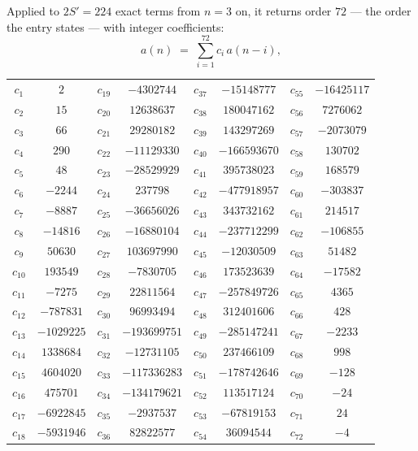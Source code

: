 \documentclass[11pt,a4paper]{article}
\theoremstyle{plain}
\theoremstyle{definition}
\begin{document}
Applied to $2S'=224$ exact terms from $n=3$ on, it returns order $72$ --- the
order the entry states --- with integer coefficients:
\[
a(n)\;=\;\sum_{i=1}^{72}c_i\,a(n-i),
\]
\begin{center}\small
\begin{tabular}{cccccccc}
$c_{1}$ & $2$ & $c_{19}$ & $-4302744$ & $c_{37}$ & $-15148777$ & $c_{55}$ & $-16425117$ \\
$c_{2}$ & $15$ & $c_{20}$ & $12638637$ & $c_{38}$ & $180047162$ & $c_{56}$ & $7276062$ \\
$c_{3}$ & $66$ & $c_{21}$ & $29280182$ & $c_{39}$ & $143297269$ & $c_{57}$ & $-2073079$ \\
$c_{4}$ & $290$ & $c_{22}$ & $-11129330$ & $c_{40}$ & $-166593670$ & $c_{58}$ & $130702$ \\
$c_{5}$ & $48$ & $c_{23}$ & $-28529929$ & $c_{41}$ & $395738023$ & $c_{59}$ & $168579$ \\
$c_{6}$ & $-2244$ & $c_{24}$ & $237798$ & $c_{42}$ & $-477918957$ & $c_{60}$ & $-303837$ \\
$c_{7}$ & $-8887$ & $c_{25}$ & $-36656026$ & $c_{43}$ & $343732162$ & $c_{61}$ & $214517$ \\
$c_{8}$ & $-14816$ & $c_{26}$ & $-16880104$ & $c_{44}$ & $-237712299$ & $c_{62}$ & $-106855$ \\
$c_{9}$ & $50630$ & $c_{27}$ & $103697990$ & $c_{45}$ & $-12030509$ & $c_{63}$ & $51482$ \\
$c_{10}$ & $193549$ & $c_{28}$ & $-7830705$ & $c_{46}$ & $173523639$ & $c_{64}$ & $-17582$ \\
$c_{11}$ & $-7275$ & $c_{29}$ & $22811564$ & $c_{47}$ & $-257849726$ & $c_{65}$ & $4365$ \\
$c_{12}$ & $-787831$ & $c_{30}$ & $96993494$ & $c_{48}$ & $312401606$ & $c_{66}$ & $428$ \\
$c_{13}$ & $-1029225$ & $c_{31}$ & $-193699751$ & $c_{49}$ & $-285147241$ & $c_{67}$ & $-2233$ \\
$c_{14}$ & $1338684$ & $c_{32}$ & $-12731105$ & $c_{50}$ & $237466109$ & $c_{68}$ & $998$ \\
$c_{15}$ & $4604020$ & $c_{33}$ & $-117336283$ & $c_{51}$ & $-178742646$ & $c_{69}$ & $-128$ \\
$c_{16}$ & $475701$ & $c_{34}$ & $-134179621$ & $c_{52}$ & $113517124$ & $c_{70}$ & $-24$ \\
$c_{17}$ & $-6922845$ & $c_{35}$ & $-2937537$ & $c_{53}$ & $-67819153$ & $c_{71}$ & $24$ \\
$c_{18}$ & $-5931946$ & $c_{36}$ & $82822577$ & $c_{54}$ & $36094544$ & $c_{72}$ & $-4$ \\
\end{tabular}
\end{center}
\end{document}
